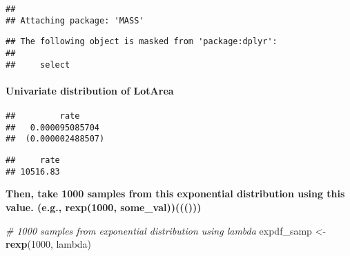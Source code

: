 \documentclass[]{article}
\newenvironment{Shaded}{\begin{snugshade}}{\end{snugshade}}
\newcommand{\KeywordTok}[1]{\textcolor[rgb]{0.13,0.29,0.53}{\textbf{#1}}}
\newcommand{\DecValTok}[1]{\textcolor[rgb]{0.00,0.00,0.81}{#1}}
\newcommand{\StringTok}[1]{\textcolor[rgb]{0.31,0.60,0.02}{#1}}
\newcommand{\CommentTok}[1]{\textcolor[rgb]{0.56,0.35,0.01}{\textit{#1}}}
\newcommand{\OperatorTok}[1]{\textcolor[rgb]{0.81,0.36,0.00}{\textbf{#1}}}
\newcommand{\NormalTok}[1]{#1}
\let\oldparagraph\paragraph
\renewcommand{\paragraph}[1]{\oldparagraph{#1}\mbox{}}
\begin{document}
\begin{verbatim}
## 
## Attaching package: 'MASS'
\end{verbatim}

\begin{verbatim}
## The following object is masked from 'package:dplyr':
## 
##     select
\end{verbatim}

\paragraph{Univariate distribution of
LotArea}\label{univariate-distribution-of-lotarea}

\begin{Shaded}
\end{Shaded}

\begin{verbatim}
##         rate     
##   0.000095085704 
##  (0.000002488507)
\end{verbatim}

\begin{Shaded}
\end{Shaded}

\begin{verbatim}
##     rate 
## 10516.83
\end{verbatim}

\textbf{Then, take 1000 samples from this exponential distribution using
this value. (e.g., rexp(1000, some\_val))((()))}

\begin{Shaded}
\begin{Highlighting}[]
\CommentTok{# 1000 samples from exponential distribution using lambda}
\NormalTok{expdf_samp <-}\StringTok{ }\KeywordTok{rexp}\NormalTok{(}\DecValTok{1000}\NormalTok{, lambda)}
\end{Highlighting}
\end{Shaded}
\end{document}
